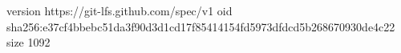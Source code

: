version https://git-lfs.github.com/spec/v1
oid sha256:e37cf4bbebc51da3f90d3d1cd17f85414154fd5973dfdcd5b268670930de4c22
size 1092
